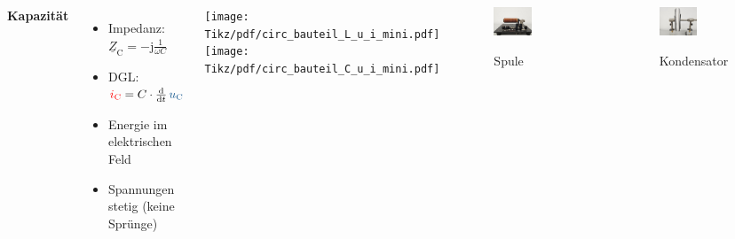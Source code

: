 \begin{frame}
{\begin{columns}
    \textbf{Kapazität}%
    \begin{itemize}
        \item Impedanz: $\underline{Z}_{\mathrm C} = -\mathrm{j}\frac{1}{\omega C}$
        \item DGL: $\eci{i_{\mathrm C}} = C \cdot \frac{\d}{\d t}\, \ecv{u_{\mathrm C}}$
        \item Energie im elektrischen Feld
        \item Spannungen stetig (keine Sprünge)
    \end{itemize}

\centering
    \texttt{[image: Tikz/pdf/circ\_bauteil\_L\_u\_i\_mini.pdf]}%
    \vspace{2cm}
    \texttt{[image: Tikz/pdf/circ\_bauteil\_C\_u\_i\_mini.pdf]}%

    \begin{figure}[H]\centering
        \includegraphics[width=0.5\textwidth]{./Bilder/Spule.png}
        \par Spule
    \end{figure}
    \begin{figure}\centering
        \includegraphics[width=0.5\textwidth]{./Bilder/Kondensator.png}
        \par Kondensator
    \end{figure}
\end{columns}
}%
\end{frame}

